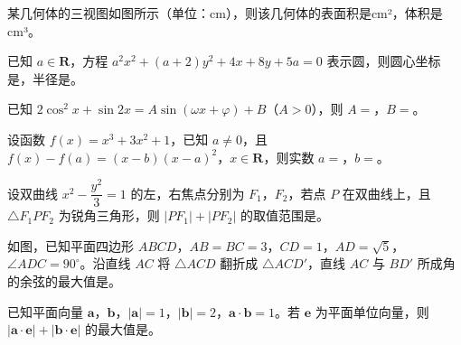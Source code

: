 \Needspace{0.4\textheight}
\begin{question}
某几何体的三视图如图所示（单位：cm），则该几何体的表面积是\gkblank{}cm²，体积是\gkblank{}cm³。
\nopagebreak[4]
\begin{center}\end{center}
\nopagebreak[4]
\end{question}
\begin{question}
已知 \(a\in\mathbf{R}\)，方程 \(a^{2}x^{2}+(a+2)y^{2}+4x+8y+5a=0\) 表示圆，则圆心坐标是\gkblank{}，半径是\gkblank{}。

\end{question}
\begin{question}
已知 \(2\cos^{2}x+\sin 2x=A\sin(\omega x+\varphi)+B\)（\(A>0\)），则 \(A=\)\gkblank{}，\(B=\)\gkblank{}。

\end{question}
\begin{question}
设函数 \(f(x)=x^{3}+3x^{2}+1\)，已知 \(a\neq0\)，且 \(f(x)-f(a)=(x-b)(x-a)^{2}\)，\(x\in\mathbf{R}\)，则实数 \(a=\)\gkblank{}，\(b=\)\gkblank{}。

\end{question}
\begin{question}
设双曲线 \(x^{2}-\dfrac{y^{2}}{3}=1\) 的左，右焦点分别为 \(F_{1}\)，\(F_{2}\)，若点 \(P\) 在双曲线上，且 \(\triangle F_{1}PF_{2}\) 为锐角三角形，则 \(|PF_{1}|+|PF_{2}|\) 的取值范围是\gkblank{}。

\Needspace{0.4\textheight}
\end{question}
\begin{question}
如图，已知平面四边形 \(ABCD\)，\(AB=BC=3\)，\(CD=1\)，\(AD=\sqrt{5}\)，\(\angle ADC=90^{\circ}\)。沿直线 \(AC\) 将 \(\triangle ACD\) 翻折成 \(\triangle ACD'\)，直线 \(AC\) 与 \(BD'\) 所成角的余弦的最大值是\gkblank{}。
\nopagebreak[4]
\begin{center}\end{center}
\nopagebreak[4]
\end{question}
\begin{question}
已知平面向量 \(\boldsymbol{a}\)，\(\boldsymbol{b}\)，\(|\boldsymbol{a}|=1\)，\(|\boldsymbol{b}|=2\)，\(\boldsymbol{a}\cdot\boldsymbol{b}=1\)。若 \(\boldsymbol{e}\) 为平面单位向量，则 \(|\boldsymbol{a}\cdot\boldsymbol{e}|+|\boldsymbol{b}\cdot\boldsymbol{e}|\) 的最大值是\gkblank{}。

\end{question}

